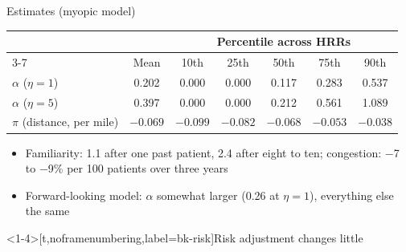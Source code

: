 \documentclass[aspectratio=169,11pt]{beamer}
\newcommand{\rrow}[4]{\uncover<#2>{%
  \node[anchor=base west, inner sep=0pt] at (0,#1) {\textcolor{emoryBlue}{\textbullet}\enspace #3};
  \node[anchor=base east, inner sep=0pt, font=\large\bfseries, text=emoryGold] at (13.4,#1) {#4};}}
\newcommand{\rsub}[3]{\uncover<#2>{%
  \node[anchor=north west, inner sep=0pt, text width=10.2cm, align=left, font=\small, text=emoryMid,
        execute at begin node={\hyphenpenalty=10000 \exhyphenpenalty=10000}] at (0.45,#1) {\textendash\enspace\parbox[t]{9.6cm}{#3}};}}
\newcommand{\rcard}[2]{\uncover<#1>{%
  \node[anchor=south, rounded corners=4pt, line width=0.7pt, draw=emoryRule, fill=emoryLight, text width=10cm,
        align=left, inner sep=7pt, font=\small] at (6.7,-5.3)
    {{\bfseries\color{emoryBlue}Takeaway\par}\vspace{2pt}#2};}}
\begin{document}
\begin{frame}[noframenumbering,label=bk-table]{Estimates (myopic model)}
  \begin{center}
  \small
  \begin{tabular}{lcccccc}
    \toprule
    & & \multicolumn{5}{c}{Percentile across HRRs} \\
    \cmidrule(lr){3-7}
    & Mean & 10th & 25th & 50th & 75th & 90th \\
    \midrule
    $\alpha$ ($\eta = 1$) & 0.202 & 0.000 & 0.000 & 0.117 & 0.283 & 0.537 \\
    $\alpha$ ($\eta = 5$) & 0.397 & 0.000 & 0.000 & 0.212 & 0.561 & 1.089 \\
    $\pi$ (distance, per mile) & $-0.069$ & $-0.099$ & $-0.082$ & $-0.068$ & $-0.053$ & $-0.038$ \\
    \bottomrule
  \end{tabular}
  \end{center}
  \vspace{0.2cm}
  \begin{itemize}\setlength{\itemsep}{5pt}
    \item Familiarity: 1.1 after one past patient, 2.4 after eight to ten; congestion: $-$7 to $-$9\% per 100 patients over three years
    \item Forward-looking model: $\alpha$ somewhat larger (0.26 at $\eta = 1$), everything else the same
  \end{itemize}
\end{frame}

\begin{frame}<1-4>[t,noframenumbering,label=bk-risk]{Risk adjustment changes little}
  \vspace{0.2cm}
\end{frame}
\end{document}
